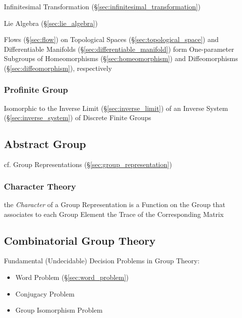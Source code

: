 Infinitesimal Transformation (\S\ref{sec:infinitesimal_transformation})

Lie Algebra (\S\ref{sec:lie_algebra})

Flows (\S\ref{sec:flow}) on Topological Spaces (\S\ref{sec:topological_space})
and Differentiable Manifolds (\S\ref{sec:differentiable_manifold}) form
One-parameter Subgroups of Homeomorphisms (\S\ref{sec:homeomorphism}) and
Diffeomorphisms (\S\ref{sec:diffeomorphism}), respectively



\subsubsection{Profinite Group}\label{sec:profinite_group}

Isomorphic to the Inverse Limit (\S\ref{sec:inverse_limit}) of an Inverse System
(\S\ref{sec:inverse_system}) of Discrete Finite Groups



\subsection{Abstract Group}\label{sec:abstract_group}

cf. Group Representations (\S\ref{sec:group_representation})



\subsubsection{Character Theory}\label{sec:character_theory}

the \emph{Character} of a Group Representation is a Function on the Group that
associates to each Group Element the Trace of the Corresponding Matrix



\subsection{Combinatorial Group Theory}\label{sec:combinatorial_group_theory}

Fundamental (Undecidable) Decision Problems in Group Theory:
\begin{itemize}
  \item Word Problem (\S\ref{sec:word_problem})
  \item Conjugacy Problem
  \item Group Isomorphism Problem
\end{itemize}



